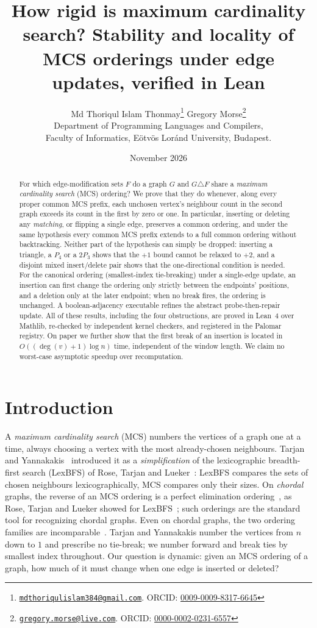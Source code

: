 \documentclass[11pt]{article}
\title{How rigid is maximum cardinality search? Stability and locality of
MCS orderings under edge updates, verified in Lean}
\author{Md Thoriqul Islam Thonmay\thanks{\href{mailto:mdthoriqulislam384@gmail.com}{\texttt{mdthoriqulislam384@gmail.com}}.
ORCID: \href{https://orcid.org/0009-0009-8317-6645}{0009-0009-8317-6645}}
\qquad Gregory Morse\thanks{\href{mailto:gregory.morse@live.com}{\texttt{gregory.morse@live.com}}.
ORCID: \href{https://orcid.org/0000-0002-0231-6557}{0000-0002-0231-6557}}\\[6pt]
\normalsize Department of Programming Languages and Compilers,\\
Faculty of Informatics, E\"otv\"os Lor\'and University, Budapest.}
\date{November 2026}
\theoremstyle{definition}
\theoremstyle{remark}
\begin{document}
\maketitle

\begin{abstract}
For which edge-modification sets $F$ do a graph $G$ and $G\triangle F$ share a
\emph{maximum cardinality search} (MCS) ordering? We prove that they do
whenever, along every proper common MCS prefix, each unchosen vertex's
neighbour count in the second graph exceeds its count in the first by zero or
one. In particular, inserting or deleting any \emph{matching}, or flipping a
single edge, preserves a common ordering, and under the same hypothesis every
common MCS prefix extends to a full common ordering without backtracking.
Neither part of the hypothesis can simply be dropped: inserting a triangle, a
$P_4$ or a $2P_3$ shows that the $+1$ bound cannot be relaxed to $+2$, and a
disjoint mixed insert/delete pair shows that the one-directional condition is
needed. For the canonical ordering (smallest-index
tie-breaking) under a single-edge update, an insertion can first change the
ordering only strictly between the endpoints' positions, and a deletion only at
the later endpoint; when no break fires, the ordering is unchanged. A
boolean-adjacency executable refines the abstract probe-then-repair update. All
of these results, including the four obstructions, are proved in Lean~4 over
Mathlib, re-checked by independent kernel checkers, and registered in the
Palomar registry. On paper we further show that the
first break of an insertion is located in $O((\deg(v)+1)\log n)$ time,
independent of the window length. We claim no worst-case asymptotic speedup over
recomputation.
\end{abstract}

\section{Introduction}
\label{sec:intro}

A \emph{maximum cardinality search} (MCS) numbers the vertices of a graph one at
a time, always choosing a vertex with the most already-chosen neighbours. Tarjan
and Yannakakis~\cite{tarjan1984mcs} introduced it as a \emph{simplification} of
the lexicographic breadth-first search (LexBFS) of Rose, Tarjan and
Lueker~\cite{rose1976algorithmic}: LexBFS compares the sets of chosen neighbours
lexicographically, MCS compares only their sizes. On \emph{chordal} graphs, the
reverse of an MCS ordering is a perfect elimination
ordering~\cite{tarjan1984mcs}, as Rose, Tarjan and Lueker showed for
LexBFS~\cite{rose1976algorithmic}; such orderings are the standard tool for
recognizing chordal graphs. Even on chordal graphs, the two ordering families are
incomparable~\cite{corneil2008unified}. Tarjan and Yannakakis number the vertices
from $n$ down to $1$ and prescribe no tie-break; we number forward and break ties
by smallest index throughout. Our question is dynamic: given an MCS ordering of a
graph, how much of it must change when one edge is inserted or deleted?
\end{document}

